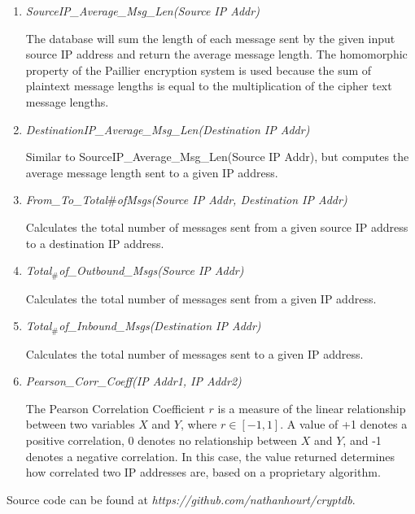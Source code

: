 \documentclass[12pt]{article}
\begin{document}
\begin{enumerate}
\item \textit{SourceIP_Average_Msg_Len(Source IP Addr)} 

The database will sum the length of each message sent by the given input source IP address and return the average message length.  The homomorphic property of the Paillier encryption system is used because the sum of plaintext message lengths is equal to the multiplication of the cipher text message lengths.

\item \textit{DestinationIP_Average_Msg_Len(Destination IP Addr)}

Similar to SourceIP_Average_Msg_Len(Source IP Addr), but computes the average message length sent to a given IP address.

\item \textit{From_To_Total$\#$ofMsgs(Source IP Addr, Destination IP Addr)}

Calculates the total number of messages sent from a given source IP address to a destination IP address.

\item \textit{Total$_\#$of_Outbound_Msgs(Source IP Addr)}

Calculates the total number of messages sent from a given IP address.

\item \textit{Total$_\#$of_Inbound_Msgs(Destination IP Addr)}

Calculates the total number of messages sent to a given IP address.

\newpage
\item \textit{Pearson_Corr_Coeff(IP Addr1, IP Addr2)}

The Pearson Correlation Coefficient $r$ is a measure of the linear relationship between two variables $X$ and $Y$, where $r\in[-1,1]$.  A value of +1 denotes a positive correlation, 0 denotes no relationship between $X$ and $Y$, and -1 denotes a negative correlation.  In this case, the value returned determines how correlated two IP addresses are, based on a proprietary algorithm.

\end{enumerate}

Source code can be found at \textit{https://github.com/nathanhourt/cryptdb}.
\end{document}
